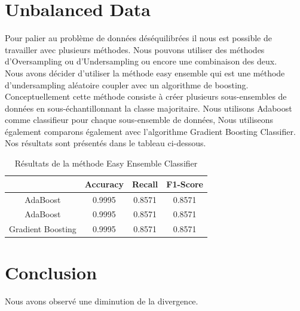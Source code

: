 \documentclass{article}
\begin{document}
\section{Unbalanced Data}
Pour palier au problème de données déséquilibrées il nous est possible de travailler avec plusieurs méthodes.
Nous pouvons utiliser des méthodes d'Oversampling ou d'Undersampling ou encore une combinaison des deux.\\
Nous avons décider d'utiliser la méthode easy ensemble qui est une méthode d'undersampling aléatoire coupler avec un algorithme de boosting.
Conceptuellement cette méthode consiste à créer plusieurs sous-ensembles de données en sous-échantillonnant la classe majoritaire.
Nous utilisons Adaboost comme classifieur pour chaque sous-ensemble de données, Nous utiliseons également comparons également avec l'algorithme Gradient Boosting Classifier.
Nos résultats sont présentés dans le tableau ci-dessous.\\

\begin{table}[h]
    \centering
    \begin{tabular}{|c|c|c|c|}
        \hline
         & Accuracy & Recall & F1-Score \\
        \hline
        AdaBoost   & 0.9995 & 0.8571 & 0.8571 \\
        \hline
        AdaBoost & 0.9995 & 0.8571 & 0.8571 \\
        \hline
        Gradient Boosting & 0.9995 & 0.8571 & 0.8571 \\
        \hline
    \end{tabular}
    \caption{Résultats de la méthode Easy Ensemble Classifier}

\end{table}

\section{Conclusion}
Nous avons observé une diminution de la divergence.
\end{document}
